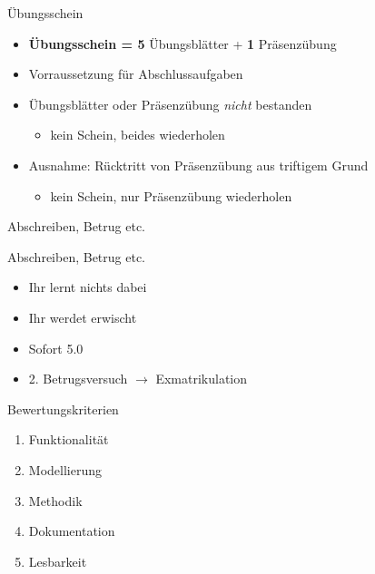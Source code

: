 \documentclass[18pt]{beamer}
\begin{document}
\begin{frame}{Übungsschein}
    \begin{itemize}
        \item \textbf{Übungsschein = \alert{5}} Übungsblätter + \textbf{\alert{1}} Präsenzübung
        \pause
        \item \alert{Vorraussetzung für Abschlussaufgaben}
        \pause
        \item Übungsblätter oder Präsenzübung \textit{nicht} bestanden
        \begin{itemize}
            \item kein Schein, beides wiederholen
        \end{itemize}
        \pause
        \item Ausnahme: Rücktritt von Präsenzübung aus triftigem Grund
        \begin{itemize}
            \item kein Schein, nur Präsenzübung wiederholen
        \end{itemize}
    \end{itemize}

\end{frame}

\begin{frame}{Abschreiben, Betrug etc.}
    \begin{alertblock}{Abschreiben, Betrug etc.}
        \begin{itemize}
            \item Ihr lernt nichts dabei
            \pause
            \item Ihr werdet erwischt
            \pause
            \item Sofort 5.0
            \pause
            \item 2. Betrugsversuch $\rightarrow$ Exmatrikulation
        \end{itemize}
    \end{alertblock}
\end{frame}


\begin{frame}{Bewertungskriterien}
    \begin{enumerate}
        \item Funktionalität
        \item Modellierung
        \item Methodik
        \item Dokumentation
        \item Lesbarkeit
    \end{enumerate}
\end{frame}
\end{document}
